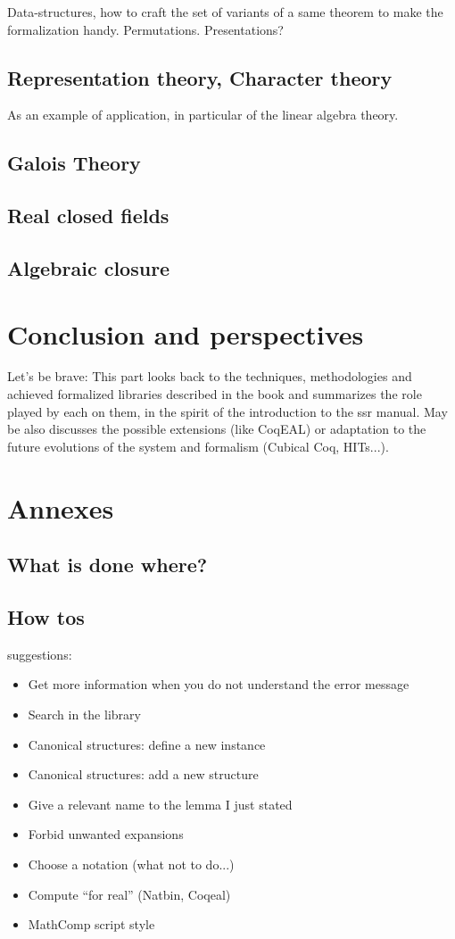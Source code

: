 \documentclass{book}
\begin{document}
Data-structures, how to craft the set of variants of a same theorem to
make the formalization handy. Permutations. Presentations?

\chapter{Representation theory, Character theory}

As an example of application, in particular of the linear algebra
theory.

\chapter{Galois Theory}


\chapter{Real closed fields}

\chapter{Algebraic closure}

\part{Conclusion and perspectives}

Let's be brave:
This part looks back to the techniques, methodologies and achieved
formalized libraries described in the book and summarizes the role
played by each on them, in the spirit of the introduction to the ssr manual.
May be also discusses the possible extensions
(like CoqEAL) or adaptation to the future evolutions of the system and
formalism (Cubical Coq, HITs...).

\part{Annexes}

\chapter{What is done where?}

\chapter{How tos}
suggestions:
\begin{itemize}
\item Get more information when you do not understand the error
  message
\item Search in the library
\item Canonical structures: define a new instance
\item Canonical structures: add a new structure
\item Give a relevant name to the lemma I just stated
\item Forbid unwanted expansions
\item Choose a notation (what not to do...)
\item Compute ``for real'' (Natbin, Coqeal)
\item MathComp script style
\end{itemize}
\end{document}
